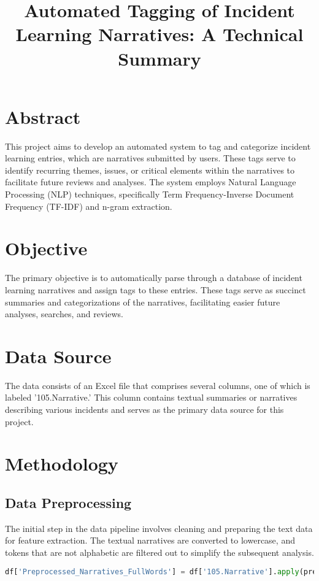 \documentclass[12pt]{article}
\title{Automated Tagging of Incident Learning Narratives: A Technical Summary}
\author{}
\date{}
\begin{document}
\maketitle

\section{Abstract}
This project aims to develop an automated system to tag and categorize incident learning entries, which are narratives submitted by users. These tags serve to identify recurring themes, issues, or critical elements within the narratives to facilitate future reviews and analyses. The system employs Natural Language Processing (NLP) techniques, specifically Term Frequency-Inverse Document Frequency (TF-IDF) and n-gram extraction.

\section{Objective}
The primary objective is to automatically parse through a database of incident learning narratives and assign tags to these entries. These tags serve as succinct summaries and categorizations of the narratives, facilitating easier future analyses, searches, and reviews.

\section{Data Source}
The data consists of an Excel file that comprises several columns, one of which is labeled '105.Narrative.' This column contains textual summaries or narratives describing various incidents and serves as the primary data source for this project.

\section{Methodology}

\subsection{Data Preprocessing}
The initial step in the data pipeline involves cleaning and preparing the text data for feature extraction. The textual narratives are converted to lowercase, and tokens that are not alphabetic are filtered out to simplify the subsequent analysis.

\begin{lstlisting}[language=Python]
df['Preprocessed_Narratives_FullWords'] = df['105.Narrative'].apply(preprocess_text)
\end{lstlisting}
\end{document}
